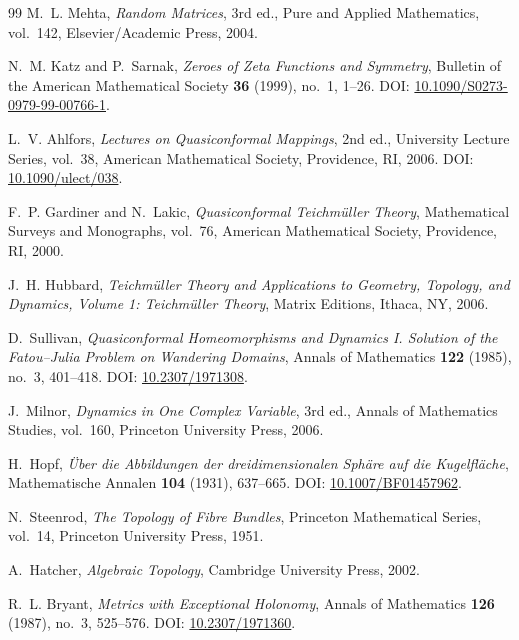 \begin{thebibliography}{99}
M.~L. Mehta,
\emph{Random Matrices},
3rd ed., Pure and Applied Mathematics, vol.~142,
Elsevier/Academic Press, 2004.

N.~M. Katz and P.~Sarnak,
\emph{Zeroes of Zeta Functions and Symmetry},
Bulletin of the American Mathematical Society \textbf{36} (1999), no.~1, 1--26.
\newblock DOI: \href{https://doi.org/10.1090/S0273-0979-99-00766-1}{10.1090/S0273-0979-99-00766-1}.

L.~V. Ahlfors,
\emph{Lectures on Quasiconformal Mappings},
2nd ed., University Lecture Series, vol.~38,
American Mathematical Society, Providence, RI, 2006.
\newblock DOI: \href{https://doi.org/10.1090/ulect/038}{10.1090/ulect/038}.

F.~P. Gardiner and N.~Lakic,
\emph{Quasiconformal Teichm\"uller Theory},
Mathematical Surveys and Monographs, vol.~76,
American Mathematical Society, Providence, RI, 2000.

J.~H. Hubbard,
\emph{Teichm\"uller Theory and Applications to Geometry, Topology, and Dynamics, Volume 1: Teichm\"uller Theory},
Matrix Editions, Ithaca, NY, 2006.

D.~Sullivan,
\emph{Quasiconformal Homeomorphisms and Dynamics I. Solution of the Fatou--Julia Problem on Wandering Domains},
Annals of Mathematics \textbf{122} (1985), no.~3, 401--418.
\newblock DOI: \href{https://doi.org/10.2307/1971308}{10.2307/1971308}.

J.~Milnor,
\emph{Dynamics in One Complex Variable},
3rd ed., Annals of Mathematics Studies, vol.~160,
Princeton University Press, 2006.

H.~Hopf,
\emph{\"Uber die Abbildungen der dreidimensionalen Sph\"are auf die Kugelfl\"ache},
Mathematische Annalen \textbf{104} (1931), 637--665.
\newblock DOI: \href{https://doi.org/10.1007/BF01457962}{10.1007/BF01457962}.

N.~Steenrod,
\emph{The Topology of Fibre Bundles},
Princeton Mathematical Series, vol.~14,
Princeton University Press, 1951.

A.~Hatcher,
\emph{Algebraic Topology},
Cambridge University Press, 2002.

R.~L. Bryant,
\emph{Metrics with Exceptional Holonomy},
Annals of Mathematics \textbf{126} (1987), no.~3, 525--576.
\newblock DOI: \href{https://doi.org/10.2307/1971360}{10.2307/1971360}.


\end{thebibliography}

